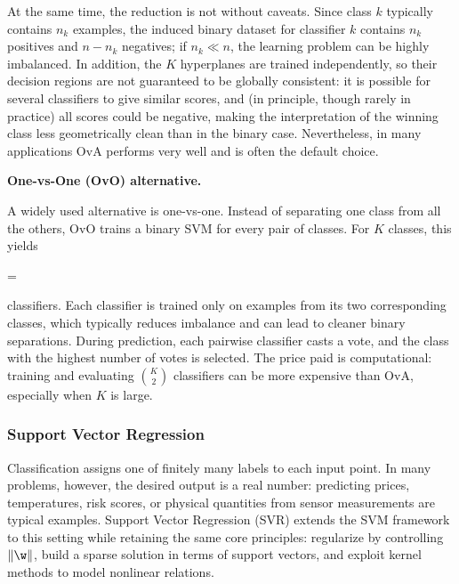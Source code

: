 At the same time, the reduction is not without caveats. Since class $k$ typically contains $n_k$ examples, the induced binary dataset for classifier $k$ contains $n_k$ positives and $n-n_k$ negatives; if $n_k \ll n$, the learning problem can be highly imbalanced. In addition, the $K$ hyperplanes are trained independently, so their decision regions are not guaranteed to be globally consistent: it is possible for several classifiers to give similar scores, and (in principle, though rarely in practice) all scores could be negative, making the interpretation of the winning class less geometrically clean than in the binary case. Nevertheless, in many applications OvA performs very well and is often the default choice.

\medskip

\textbf{One-vs-One (OvO) alternative.}

A widely used alternative is \alert{one-vs-one}. Instead of separating one class from all the others, OvO trains a binary SVM for every pair of classes. For $K$ classes, this yields
\begin{myequation*}
 = 
\end{myequation*}
classifiers. Each classifier is trained only on examples from its two corresponding classes, which typically reduces imbalance and can lead to cleaner binary separations. During prediction, each pairwise classifier casts a vote, and the class with the highest number of votes is selected. The price paid is computational: training and evaluating $\binom{K}{2}$ classifiers can be more expensive than OvA, especially when $K$ is large.

\medskip

\subsubsection*{Support Vector Regression}

Classification assigns one of finitely many labels to each input point. In many problems, however, the desired output is a real number: predicting prices, temperatures, risk scores, or physical quantities from sensor measurements are typical examples. Support Vector Regression (SVR) extends the SVM framework to this setting while retaining the same core principles: regularize by controlling $\|\w\|$, build a sparse solution in terms of support vectors, and exploit kernel methods to model nonlinear relations.

\medskip

